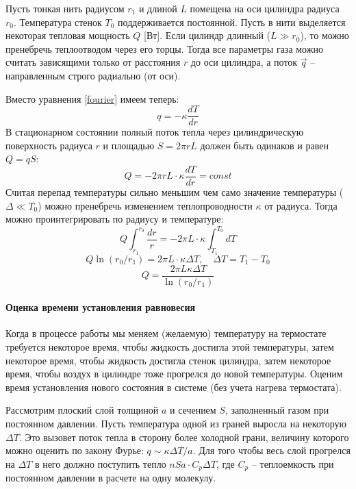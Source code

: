 \documentclass[a4paper,12pt]{report}
\begin{document}
    Пусть тонкая нить радиусом $r_1$ и длиной $L$ помещена на оси цилиндра радиуса $r_0$. Температура стенок $T_0$ поддерживается постоянной. Пусть в нити выделяется некоторая тепловая мощность $Q$ [Вт]. Если цилиндр длинный ($L\gg r_0$), то можно пренебречь теплоотводом через его торцы. Тогда все параметры газа можно считать зависящими только от расстояния $r$ до оси цилиндра, а поток $\vec{q}$ -- направленным строго радиально (от оси).

    Вместо уравнения \eqref{fourier} имеем теперь:
    \begin{equation}
        \label{q new}
        q=-\kappa\frac{dT}{dr}
    \end{equation}
    В стационарном состоянии полный поток тепла через цилиндрическую поверхность радиуса $r$ и площадью $S=2\pi rL$ должен быть одинаков и равен $Q=qS$:
    \begin{equation}
        \label{Q}
        Q=-2\pi r L\cdot \kappa \frac{dT}{dr}=const
    \end{equation}
    Считая перепад температуры сильно меньшим чем само значение температуры ($\Delta \ll T_0$) можно пренебречь изменением теплопроводности $\kappa$ от радиуса. Тогда можно проинтегрировать по радиусу и температуре:
    \begin{equation*}
        Q\int_{r_1}^{r_0}\frac{dr}{r}=-2\pi L\cdot \kappa  \int_{T_1}^{T_0}dT 
    \end{equation*}
    \begin{equation*}
        Q\ln(r_0/r_1)=2\pi L \cdot \kappa \Delta T, \quad \Delta T=T_1-T_0
    \end{equation*}
    \begin{equation}
        \label{Qfinal}
        Q=\frac{2\pi L\kappa\Delta T}{\ln (r_0/r_1)}
    \end{equation}

    \paragraph*{Оценка времени установления равновесия} Когда в процессе работы мы меняем (желаемую) температуру на термостате требуется некоторое время, чтобы жидкость достигла этой температуры, затем некоторое время, чтобы жидкость достигла стенок цилиндра, затем некоторое время, чтобы воздух в цилиндре тоже прогрелся до новой температуры. Оценим время установления нового состояния в системе (без учета нагрева термостата).

    Рассмотрим плоский слой толщиной $a$ и сечением $S$, заполненный газом при постоянном давлении. Пусть температура одной из граней выросла на некоторую $\Delta T$. Это вызовет поток тепла в сторону более холодной грани, величину которого можно оценить по закону Фурье: $q\sim \kappa \Delta T/a$. Для того чтобы весь слой прогрелся на $\Delta T$ в него должно поступить тепло $nSa\cdot C_p\Delta T$, где $C_p$ -- теплоемкость при постоянном давлении в расчете на одну молекулу.
\end{document}
